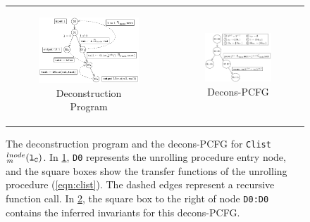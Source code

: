 \begin{figure}
\begin{tabular}{cc}
\begin{subfigure}[b]{0.50\textwidth}
\includegraphics[scale=0.75]{figClistCfg.pdf}
\caption{\label{fig:deconsProg}Deconstruction Program}
\end{subfigure}%
&
\begin{subfigure}[b]{0.50\textwidth}
\includegraphics[scale=0.75]{figClistProductCfg.pdf}
\caption{\label{fig:deconsPCFG}Decons-PCFG}
\end{subfigure}%
\\
\end{tabular}
\vspace{-8px}
\caption{\label{fig:decons}The deconstruction program and the decons-PCFG for {\tt Clist$^{lnode}_m({\tt l_{C}})$}. In \cref{fig:deconsProg}, {\tt D0} represents the unrolling procedure entry node, and the square boxes show the transfer functions of the unrolling procedure (\cref{eqn:clist}). The dashed edges represent a recursive function call. In \cref{fig:deconsPCFG}, the square box to the right of node {\tt D0:D0} contains the inferred invariants for this decons-PCFG.}
\vspace{-8px}
\end{figure}
